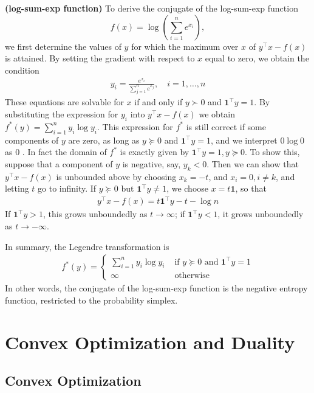 \documentclass{article}
\newcommand{\bfs}[1]{\textbf{({#1}) }}
\begin{document}
\begin{exma}\bfs{log-sum-exp function}\label{rem:nhdfcz}
To derive the conjugate of the log-sum-exp function $$f(x)=\log \left(\sum_{i=1}^{n} e^{x_{i}}\right),$$ we first determine the values of $y$ for which the maximum over $x$ of $y^{\top} x-f(x)$ is attained. By setting the gradient with respect to $x$ equal to zero, we obtain the condition
\begin{align*}
y_{i}=\frac{e^{x_{i}}}{\sum_{j=1}^{n} e^{x_{j}}}, \quad i=1, \ldots, n
\end{align*}
These equations are solvable for $x$ if and only if $y \succ 0$ and $\mathbf{1}^{\top} y=1$. By substituting the expression for $y_{i}$ into $y^{\top} x-f(x)$ we obtain $f^{*}(y)=\sum_{i=1}^{n} y_{i} \log y_{i}$. This expression for $f^{*}$ is still correct if some components of $y$ are zero, as long as $y \succeq 0$ and $\mathbf{1}^{\top} y=1$, and we interpret $0 \log 0$ as 0 .
In fact the domain of $f^{*}$ is exactly given by $\mathbf{1}^{\top} y=1, y \succeq 0$. To show this, suppose that a component of $y$ is negative, say, $y_{k}<0$. Then we can show that $y^{\top} x-f(x)$ is unbounded above by choosing $x_{k}=-t$, and $x_{i}=0, i \neq k$, and letting $t$ go to infinity.
If $y \succeq 0$ but $\mathbf{1}^{\top} y \neq 1$, we choose $x=t \mathbf{1}$, so that
\begin{align*}
y^{\top} x-f(x)=t \mathbf{1}^{\top} y-t-\log n
\end{align*}
If $\mathbf{1}^{\top} y>1$, this grows unboundedly as $t \rightarrow \infty$; if $\mathbf{1}^{\top} y<1$, it grows unboundedly as $t \rightarrow-\infty$.

In summary, the Legendre transformation  is 
\begin{align*}
f^{*}(y)= \begin{cases}\sum_{i=1}^{n} y_{i} \log y_{i} & \text { if } y \succeq 0 \text { and } \mathbf{1}^{\top} y=1 \\ \infty & \text { otherwise }\end{cases}
\end{align*}
In other words, the conjugate of the log-sum-exp function is the negative entropy function, restricted to the probability simplex.
\end{exma} 
\section{Convex Optimization and Duality}
\subsection{Convex Optimization}
\end{document}
